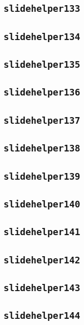 \subsection{\texttt{slidehelper133}}
\newpage
\subsection{\texttt{slidehelper134}}
\newpage
\subsection{\texttt{slidehelper135}}
\newpage
\subsection{\texttt{slidehelper136}}
\newpage
\subsection{\texttt{slidehelper137}}
\newpage
\subsection{\texttt{slidehelper138}}
\newpage
\subsection{\texttt{slidehelper139}}
\newpage
\subsection{\texttt{slidehelper140}}
\newpage
\subsection{\texttt{slidehelper141}}
\newpage
\subsection{\texttt{slidehelper142}}
\newpage
\subsection{\texttt{slidehelper143}}
\newpage
\subsection{\texttt{slidehelper144}}
\newpage
